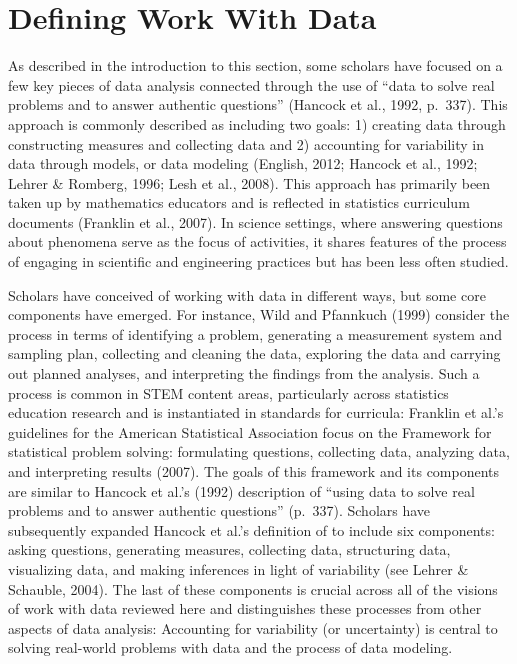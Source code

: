 \documentclass[]{msu-thesis}
\theoremstyle{definition}
\theoremstyle{definition}
\theoremstyle{definition}
\theoremstyle{remark}
\begin{document}
\section{Defining Work With Data}\label{defining-work-with-data}

As described in the introduction to this section, some scholars have
focused on a few key pieces of data analysis connected through the use
of ``data to solve real problems and to answer authentic questions''
(Hancock et al., 1992, p.~337). This approach is commonly described as
including two goals: 1) creating data through constructing measures and
collecting data and 2) accounting for variability in data through
models, or data modeling (English, 2012; Hancock et al., 1992; Lehrer \&
Romberg, 1996; Lesh et al., 2008). This approach has primarily been
taken up by mathematics educators and is reflected in statistics
curriculum documents (Franklin et al., 2007). In science settings, where
answering questions about phenomena serve as the focus of activities, it
shares features of the process of engaging in scientific and engineering
practices but has been less often studied.

Scholars have conceived of working with data in different ways, but some
core components have emerged. For instance, Wild and Pfannkuch (1999)
consider the process in terms of identifying a problem, generating a
measurement system and sampling plan, collecting and cleaning the data,
exploring the data and carrying out planned analyses, and interpreting
the findings from the analysis. Such a process is common in STEM content
areas, particularly across statistics education research and is
instantiated in standards for curricula: Franklin et al.'s guidelines
for the American Statistical Association focus on the Framework for
statistical problem solving: formulating questions, collecting data,
analyzing data, and interpreting results (2007). The goals of this
framework and its components are similar to Hancock et al.'s (1992)
description of ``using data to solve real problems and to answer
authentic questions'' (p.~337). Scholars have subsequently expanded
Hancock et al.'s definition of to include six components: asking
questions, generating measures, collecting data, structuring data,
visualizing data, and making inferences in light of variability (see
Lehrer \& Schauble, 2004). The last of these components is crucial
across all of the visions of work with data reviewed here and
distinguishes these processes from other aspects of data analysis:
Accounting for variability (or uncertainty) is central to solving
real-world problems with data and the process of data modeling.
\end{document}
